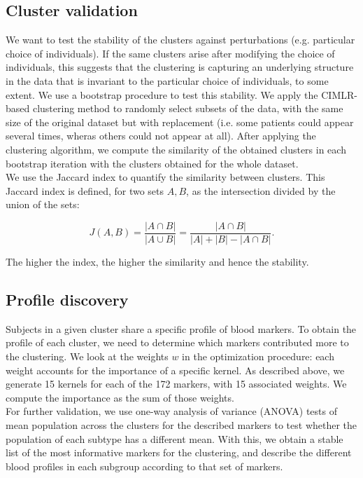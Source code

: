 \subsection{Cluster validation}

We want to test the stability of the clusters against perturbations (e.g. particular choice of individuals). If the same clusters arise after modifying the choice of individuals, this suggests that the clustering is capturing an underlying structure in the data that is invariant to the particular choice of individuals, to some extent. We use a bootstrap procedure to test this stability. We apply the CIMLR-based clustering method to randomly select subsets of the data, with the same size of the original dataset but with replacement (i.e. some patients could appear several times, wheras others could not appear at all). After applying the clustering algorithm, we compute the similarity of the obtained clusters in each bootstrap iteration with the clusters obtained for the whole dataset. \\

We use the Jaccard index to quantify the similarity between clusters. This Jaccard index is defined, for two sets $A,B$, as the intersection divided by the union of the sets:

\begin{equation}
J(A,B) = {\frac{|A \cap B|}{|A \cup B|}} = {\frac{|A \cap B|}{|A| + |B| - |A \cap B|}}.
\end{equation}

The higher the index, the higher the similarity and hence the stability.

\subsection{Profile discovery}

Subjects in a given cluster share a specific profile of blood markers. To obtain the profile of each cluster, we need to determine which markers contributed more to the clustering. We look at the weights $w$ in the optimization procedure: each weight accounts for the importance of a specific kernel. As described above, we generate 15 kernels for each of the 172 markers, with 15 associated weights. We compute the importance as the sum of those weights. \\

For further validation, we use one-way analysis of variance (ANOVA) tests of mean population across the clusters for the described markers to test whether the population of each subtype has a different mean. With this, we obtain a stable list of the most informative markers for the clustering, and describe the different blood profiles in each subgroup according to that set of markers. \\

